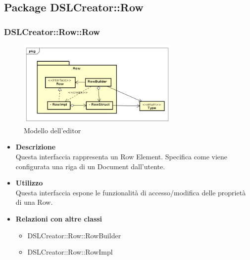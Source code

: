 \subsection{Package DSLCreator::Row}
 \subsubsection{DSLCreator::Row::Row}
                 \begin{figure}[H]
                  \centering
                  \includegraphics[width=0.7\textwidth]{res/img/Row.png}
                  \caption{Modello dell'editor}
                  \label{fig:diagram_model}
                \end{figure}
                    \begin{itemize}
                        \item \textbf{Descrizione} \hfill \\
                          Questa interfaccia rappresenta un Row Element. Specifica come viene configurata una riga di un Document dall'utente.
                        \item \textbf{Utilizzo} \hfill \\
                          Questa interfaccia espone le funzionalità di accesso/modifica delle proprietà di una Row.
                        \item \textbf{Relazioni con altre classi}
                            \begin{itemize}
                              \item DSLCreator::Row::RowBuilder
                              \item DSLCreator::Row::RowImpl
                            \end{itemize}
                    \end{itemize}

